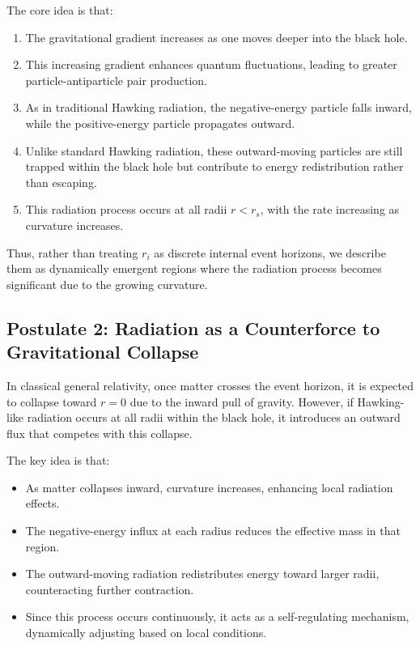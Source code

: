 The core idea is that:
\begin{enumerate}
    \item The gravitational gradient increases as one moves deeper into the black hole.
    \item This increasing gradient enhances quantum fluctuations, leading to greater particle-antiparticle pair production.
    \item As in traditional Hawking radiation, the negative-energy particle falls inward, while the positive-energy particle propagates outward.
    \item Unlike standard Hawking radiation, these outward-moving particles are still trapped within the black hole but contribute to energy redistribution rather than escaping.
    \item This radiation process occurs at all radii \( r < r_s \), with the rate increasing as curvature increases.
\end{enumerate}

Thus, rather than treating \( r_i \) as discrete internal event horizons, we describe them as dynamically emergent regions where the radiation process becomes significant due to the growing curvature.

\subsection{Postulate 2: Radiation as a Counterforce to Gravitational Collapse}

In classical general relativity, once matter crosses the event horizon, it is expected to collapse toward \( r = 0 \) due to the inward pull of gravity. However, if Hawking-like radiation occurs at all radii within the black hole, it introduces an outward flux that competes with this collapse.

The key idea is that:
\begin{itemize}
    \item As matter collapses inward, curvature increases, enhancing local radiation effects.
    \item The negative-energy influx at each radius reduces the effective mass in that region.
    \item The outward-moving radiation redistributes energy toward larger radii, counteracting further contraction.
    \item Since this process occurs continuously, it acts as a self-regulating mechanism, dynamically adjusting based on local conditions.
\end{itemize}

